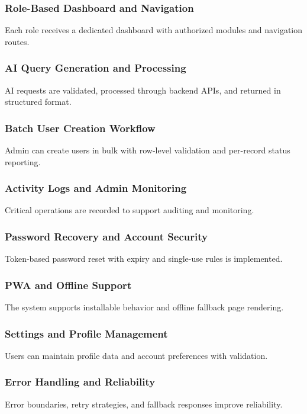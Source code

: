 \documentclass[12pt,a4paper]{article}
\begin{document}
\subsubsection{Role-Based Dashboard and Navigation}
Each role receives a dedicated dashboard with authorized modules and navigation routes.

\subsubsection{AI Query Generation and Processing}
AI requests are validated, processed through backend APIs, and returned in structured format.

\subsubsection{Batch User Creation Workflow}
Admin can create users in bulk with row-level validation and per-record status reporting.

\subsubsection{Activity Logs and Admin Monitoring}
Critical operations are recorded to support auditing and monitoring.

\subsubsection{Password Recovery and Account Security}
Token-based password reset with expiry and single-use rules is implemented.

\subsubsection{PWA and Offline Support}
The system supports installable behavior and offline fallback page rendering.

\subsubsection{Settings and Profile Management}
Users can maintain profile data and account preferences with validation.

\subsubsection{Error Handling and Reliability}
Error boundaries, retry strategies, and fallback responses improve reliability.
\end{document}
